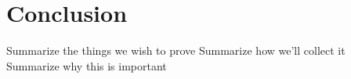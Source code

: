 \section{Conclusion}

Summarize the things we wish to prove
Summarize how we'll collect it
Summarize why this is important

